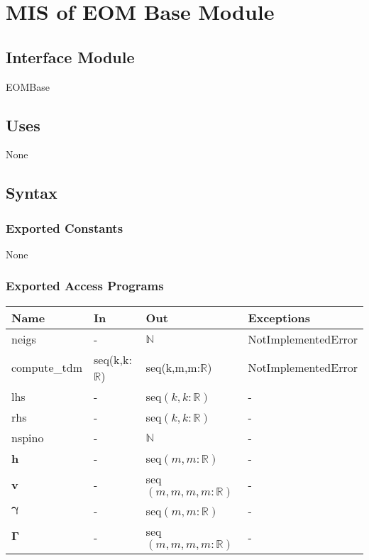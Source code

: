 \documentclass[12pt, titlepage]{article}
\begin{document}
\newpage

\section{MIS of EOM Base Module} \label{mEOM}

\subsection{Interface Module}

EOMBase

\subsection{Uses}
None

\subsection{Syntax}

\subsubsection{Exported Constants}
None

\subsubsection{Exported Access Programs}

\begin{center}
	\begin{tabular}{p{2.3cm} p{4cm} p{4cm} p{2cm}}
		\hline
		\textbf{Name} & \textbf{In} & \textbf{Out} & \textbf{Exceptions} \\
		\hline
		neigs & -& $\mathbb{N}$& NotImplementedError\\
		compute\_tdm& seq(k,k:$\mathbb{R}$)& seq(k,m,m:$\mathbb{R}$)& 
		NotImplementedError\\
		lhs & -& seq$(k,k:\mathbb{R})$& -\\
		rhs& -& seq$(k,k:\mathbb{R})$& -\\
		nspino& -& $\mathbb{N}$& -\\
		\textbf{h}& -& seq$(m,m:\mathbb{R})$& -\\
		\textbf{v}& -& seq$(m,m,m,m:\mathbb{R})$& -\\
		$\boldsymbol{\gamma}$& -& seq$(m,m:\mathbb{R})$& -\\
		$\boldsymbol{\Gamma}$& -& seq$(m,m,m,m:\mathbb{R})$& -\\
		\hline
	\end{tabular}
\end{center}
\end{document}
